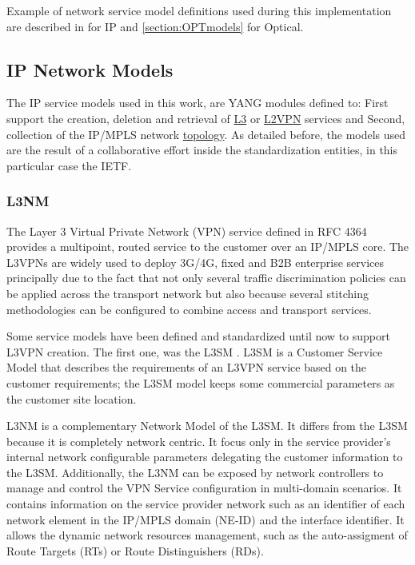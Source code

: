 \documentclass[a4paper,fleqn]{cas-dc}
\begin{document}
Example of network service model definitions used during this implementation are described in  for IP and \cref{section:OPTmodels} for Optical.

\subsection{IP Network Models}
\label{section:IPmodels}

The IP service models used in this work, are YANG modules defined to: First support the creation, deletion and retrieval of \hyperref[section:l3nm]{L3} or \hyperref[section:l2nm]{L2VPN} services and Second, collection of the IP/MPLS network \hyperref[subsection:IPtopo]{topology}. As detailed before, the models used are the result of a collaborative effort inside the standardization entities, in this particular case the IETF.

\subsubsection{L3NM}
\label{section:l3nm}
The Layer 3 Virtual Private Network (VPN) service defined in RFC 4364 \cite{rosen2006rfc} provides a multipoint, routed service to the customer over an IP/MPLS core. The L3VPNs are widely used to deploy 3G/4G, fixed and B2B enterprise services principally due to the fact that not only several traffic discrimination policies can be applied across the transport network but also because several stitching methodologies can be configured to combine access and transport services. 

Some service models have been defined and standardized until now to support L3VPN creation. The first one, was the L3SM \cite{rfc8299}. L3SM is a Customer Service Model that describes the requirements of an L3VPN service based on the customer requirements; the L3SM model keeps some commercial parameters as the customer site location.

L3NM \cite{voyer2019internet} is a complementary Network Model of the L3SM. It differs from the L3SM because it is completely network centric. It focus only in the service provider's internal network configurable parameters delegating the customer information to the L3SM. Additionally, the L3NM can be exposed by network controllers to manage and control the VPN Service configuration in multi-domain scenarios. It contains information on the service provider network such as an identifier of each network element in the IP/MPLS domain (NE-ID) and the interface identifier. It allows the dynamic network resources management, such as the auto-assigment of Route Targets (RTs) or Route Distinguishers (RDs).
\end{document}
